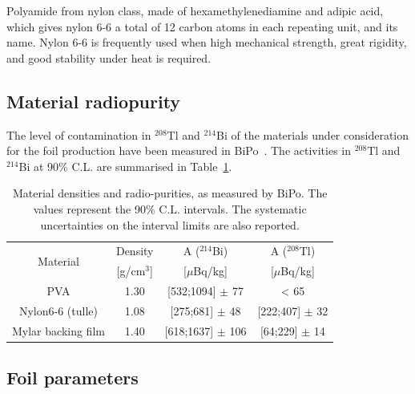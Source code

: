 \documentclass[main.tex]{subfiles}
\begin{document}
\NI Polyamide from nylon class, made of hexamethylenediamine and adipic acid, which gives nylon 6-6 a total of 12 carbon atoms in each repeating unit, and its name. Nylon 6-6 is frequently used when high mechanical strength, great rigidity, and good stability under heat is required.


\subsection{Material radiopurity}\label{sec:MaterialRadiopurity}


\NI The level of contamination in $^{\text{208}}$Tl and $^{\text{214}}$Bi of the materials under consideration for the foil production have been measured in BiPo~\cite{BiPoDetector}. The activities in $^{\text{208}}$Tl and $^{\text{214}}$Bi at 90\% C.L. are summarised in Table~\ref{tab:MeasuredBiPoAndDensity}.


\begin{table}[h!]
\centering
\begin{tabular}{c|c|c|c}
\toprule
\multirow{2}{*}{Material} & Density           &  A ($^{\text{214}}$Bi) & A ($^{\text{208}}$Tl) \\[0.1cm]
                          & [g/cm$^\text{3}$] & [$\mu$Bq/kg]           & [$\mu$Bq/kg] \\[0.1cm]
\hline
PVA                       & 1.30              & [532;1094] $\pm$ 77 & < 65 \\ [0.1cm]
\hline
Nylon6-6 (tulle)          & 1.08              & [275;681] $\pm$ 48  & [222;407] $\pm$ 32 \\[0.1cm]
\hline
Mylar backing film        & 1.40              & [618;1637] $\pm$ 106 & [64;229] $\pm$ 14 \\ [0.1cm]    
\bottomrule                  
\end{tabular}
\caption{Material densities and radio-purities, as measured by BiPo. The values represent the 90\% C.L. intervals. The systematic uncertainties on the interval limits are also reported.}
\label{tab:MeasuredBiPoAndDensity}
\end{table}


\FloatBarrier


\subsection{Foil parameters}\label{sec:FoilParameters}
\end{document}
